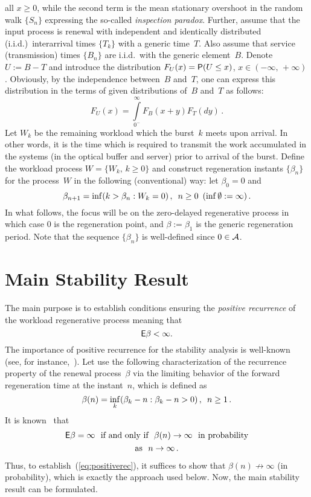 \begin{multicols}{2}
all  $x \ge 0$, while the second term is the mean stationary  overshoot in the 
random walk $\{S_n\}$ expressing the so-called {\it inspection paradox}. 
Further, assume that the input process is renewal with independent and 
identically distributed (i.i.d.)\ interarrival times $\{T_k\}$ with a generic 
time~$T$. Also assume that service (transmission)  times $\{B_n\}$ are 
i.i.d.\ with the generic element~$B$. Denote $U:=B-T$ and introduce the distribution 
$F_{U}(x)={\sf P}(U\le x)$, $x\in (-\infty,\,+\infty)$.  Obviously, by the 
independence between~$B$ and~$T$, one can express this distribution in the terms 
of given distributions of~$B$ and~$T$ as follows:
$$
F_U(x)=\int\limits_{0^-}^\infty F_B(x+y)F_T(dy)\,.
$$
Let $W_k$ be the remaining workload which the burst~$k$ meets upon 
arrival. In other words, it is the time which is required to
transmit  the  work accumulated in the systems (in the optical
buffer and server) prior to arrival of the  burst. Define  the workload
process $W=\{W_{k},\,k\ge0\}$ and
 construct  regeneration instants  $\{\beta_{n}\}$ for the
 process~$W$ in the following (conventional) way: let $\beta_{0}=0$
and
\begin{equation*}
\beta_{n+1}=\inf(k>\beta_{n}:W_{k}=0)\,,\enskip n\ge0\enskip
(\inf\emptyset:=\infty)\,. 
\end{equation*}
In what follows, the focus will be on  the  zero-delayed regenerative process
in which case $0$ is the regeneration point, and $\beta:=\beta_1$ is the
generic regeneration period. Note that the  sequence $\{\beta_{n}\}$
is well-defined since $0\in{\mathcal A}$.

\section{Main Stability Result}
\setcounter{section}{3}

\noindent
The main purpose is to establish conditions ensuring the {\it positive 
recurrence} of the workload regenerative process meaning that 
\begin{equation} 
{\sf E} 
\beta<\infty.\label{eq:positiverec}
\end{equation}
The importance of  positive recurrence for the stability analysis
is well-known (see, for instance,~\cite{Asmus, 2}). Let use the
following characterization of the recurrence property of the renewal
process~$\beta$ via the limiting behavior of the forward
regeneration time at the instant~$n$, which is defined as
\begin{equation*} 
\beta(n)=\inf_{k}(\beta_{k}-n:\beta_{k}-n>0)\,,\enskip
n\ge1\,.
\end{equation*}
 It is known~\cite{Feller}
  that
 \begin{multline}
 {\sf E} \beta=\infty\ \ \mbox{if and only if}\ \
 \beta(n)\to\infty\ \ \mbox{in probability} \\
\mbox{as}\ \  n\to\infty\,.\label{eq:Feller}
\end{multline}
Thus, to establish~(\ref{eq:positiverec}), it suffices to show that
$\beta(n)\not \to\infty$ (in probability), which is exactly the approach 
used below. Now,  the main stability result can be formulated.


\end{multicols}

